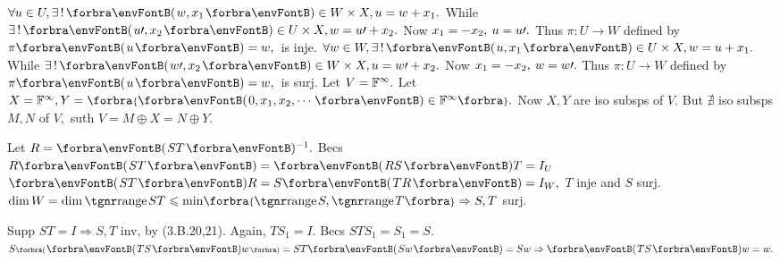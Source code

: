 $\forall u\in U,\exists\,!\,\Par{w,x_1}\in W\times X,u=w+x_1.$ While $\exists\,!\,\Par{u\apostrophe,x_2}\in U\times X,w=u\apostrophe+x_2.$\parSol{}
Now $x_1=-x_2,\:u=u\prime.$ Thus $\pi:U\rightarrow W$ defined by $\pi\Par{u}=w,$ \,is inje.\parSol{\vspace{3pt}}
$\forall w\in W,\exists\,!\,\Par{u,x_1}\in U\times X,w=u+x_1.$ While $\exists\,!\,\Par{w\apostrophe,x_2}\in W\times X,u=w\apostrophe+x_2.$\parSol{}
Now $x_1=-x_2,\:w=w\prime.$ Thus $\pi:U\rightarrow W$ defined by $\pi\Par{u}=w,$ \,is surj.\PfEnd\vspace{4pt}
\AComm Let $V={\mathbb{F}}^{\infty}.$ Let $X=\Fbb^{\infty},Y=\Bra{\Par{0,x_1,x_2,\cdots}\in\Fbb^{\infty}}.$ Now $X,Y$ are iso subsps of $V.$\parCom
But $\nexists$ iso subsps $M,N$ of $V,$ suth $V=M\oplus X=N\oplus Y.$
\SepLine



Let $R=\Par{ST}{^{-1}}.$ Becs $R\Par{ST}=\Par{RS}T=I_U$ \OR $\Par{ST}R=S\Par{TR}=I_W,$ $T$ inje and $S$ surj.\PfEnd\parSol{}
\Or $\dim W=\dim\range ST\leqslant\min\!\Bra{\range S,\range T}\Rightarrow S,T$ surj.\PfEnd
\SepLine

Supp $ST=I\Rightarrow S,T$ inv, by (3.B.20,21). Again, $TS_1=I.$ Becs $STS_1=S_1=S.$\PfEnd\parSol{}
\Or $S\BigPar{\Par{TS}w}=ST\Par{Sw}=Sw\Rightarrow\Par{TS}w=w.$ \;\PfEnd
\SepLine

